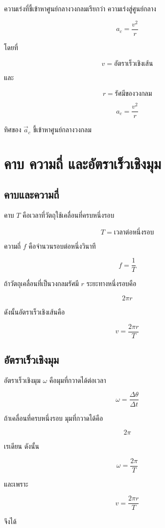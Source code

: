 ความเร่งที่ชี้เข้าหาศูนย์กลางวงกลมเรียกว่า ความเร่งสู่ศูนย์กลาง

\[
a_c=\frac{v^2}{r}
\]

โดยที่

\[
v=\text{อัตราเร็วเชิงเส้น}
\]

และ

\[
r=\text{รัศมีของวงกลม}
\]

\begin{tcolorbox}[title=ความเร่งสู่ศูนย์กลาง]
\[
a_c=\frac{v^2}{r}
\]

ทิศของ $\vec{a}_c$ ชี้เข้าหาศูนย์กลางวงกลม
\end{tcolorbox}

\section{คาบ ความถี่ และอัตราเร็วเชิงมุม}

\subsection{คาบและความถี่}

คาบ $T$ คือเวลาที่วัตถุใช้เคลื่อนที่ครบหนึ่งรอบ

\[
T=\text{เวลาต่อหนึ่งรอบ}
\]

ความถี่ $f$ คือจำนวนรอบต่อหนึ่งวินาที

\[
f=\frac{1}{T}
\]

ถ้าวัตถุเคลื่อนที่เป็นวงกลมรัศมี $r$ ระยะทางหนึ่งรอบคือ

\[
2\pi r
\]

ดังนั้นอัตราเร็วเชิงเส้นคือ

\[
v=\frac{2\pi r}{T}
\]

\subsection{อัตราเร็วเชิงมุม}

อัตราเร็วเชิงมุม $\omega$ คือมุมที่กวาดได้ต่อเวลา

\[
\omega=\frac{\Delta\theta}{\Delta t}
\]

ถ้าเคลื่อนที่ครบหนึ่งรอบ มุมที่กวาดได้คือ

\[
2\pi
\]

เรเดียน ดังนั้น

\[
\omega=\frac{2\pi}{T}
\]

และเพราะ

\[
v=\frac{2\pi r}{T}
\]

จึงได้

